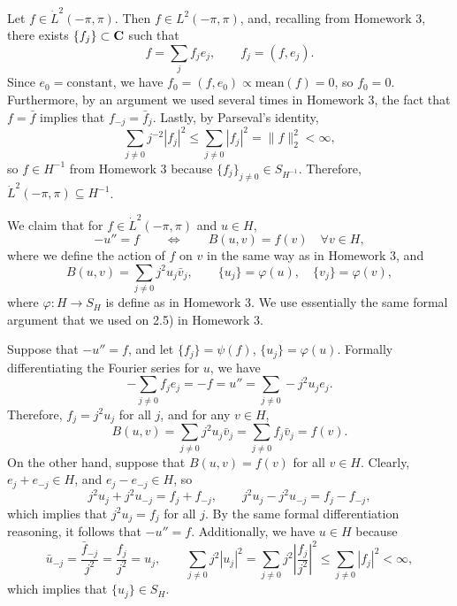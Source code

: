 \documentclass{homework}
\begin{document}
	\begin{arabicparts}
		\questionpart Let $f \in \dot{L}^2(-\pi, \pi)$. Then $f \in L^2(-\pi,\pi)$, and, recalling from Homework 3, there exists $\{f_j\} \subset \textnormal{\bf C}$ such that
		\begin{equation}
			f = \sum_j f_j e_j, \qquad f_j = (f, e_j).
		\end{equation}
		Since $e_0 = \text{constant}$, we have $f_0 = (f,e_0) \propto \mathrm{mean}(f) = 0$, so $f_0 = 0$. Furthermore, by an argument we used several times in Homework 3, the fact that $f = \bar{f}$ implies that $f_{-j} = \bar{f}_j$. Lastly, by Parseval's identity,
		\begin{equation}
			\sum_{j\ne 0}j^{-2}|f_j|^2 \le \sum_{j\ne0}|f_j|^2 = \lVert f\rVert_2^2 < \infty,
		\end{equation}
		so $f \in H^{-1}$ from Homework 3 because $\{f_j\}_{j\ne0} \in S_{H^{-1}}$. Therefore, $\dot{L}^2(-\pi,\pi) \subseteq H^{-1}$.
		
		We claim that for $f \in \dot{L}^2(-\pi,\pi)$ and $u \in H$,
		\begin{equation}
			-u'' = f \qquad \iff \qquad B(u,v) = f(v) \quad\forall v\in H,
		\end{equation}
		where we define the action of $f$ on $v$ in the same way as in Homework 3, and
		\begin{equation}
			B(u,v) = \sum_{j\ne0}j^2u_j\bar{v}_j,\qquad \{u_j\} = \varphi(u),\quad\{v_j\} = \varphi(v),
		\end{equation}
		where $\varphi : H \to S_H$ is define as in Homework 3. We use essentially the same formal argument that we used on 2.5) in Homework 3.
		
		Suppose that $-u'' = f$, and let $\{f_j\} = \psi(f)$, $\{u_j\} = \varphi(u)$. Formally differentiating the Fourier series for $u$, we have
		\begin{equation}
			-\sum_{j\ne0}f_je_j = -f = u'' = \sum_{j\ne0} -j^2u_je_j.
		\end{equation}
		Therefore, $f_j = j^2u_j$ for all $j$, and for any $v \in H$,
		\begin{equation}
			B(u,v) = \sum_{j\ne0}j^2u_j\bar{v}_j = \sum_{j\ne0}f_j\bar{v}_j = f(v).
		\end{equation}
		On the other hand, suppose that $B(u,v) = f(v)$ for all $v \in H$. Clearly, $e_j + e_{-j} \in H$, and $e_j - e_{-j} \in H$, so
		\begin{equation}
			j^2u_j + j^2u_{-j} = f_j + f_{-j},\qquad j^2u_j - j^2u_{-j} = f_j - f_{-j},
		\end{equation}
		which implies that $j^2u_j = f_j$ for all $j$. By the same formal differentiation reasoning, it follows that $-u'' = f$. Additionally, we have $u \in H$ because
		\begin{equation}
			\bar{u}_{-j} = \frac{\bar{f}_{-j}}{j^2} = \frac{f_j}{j^2} = u_j, \qquad \sum_{j\ne0}j^2|u_j|^2 = \sum_{j\ne0}j^2\left|\frac{f_j}{j^2}\right|^2 \le \sum_{j\ne0}|f_j|^2 < \infty,
		\end{equation}
		which implies that $\{u_j\} \in S_H$.
		

\end{arabicparts}
\end{document}
